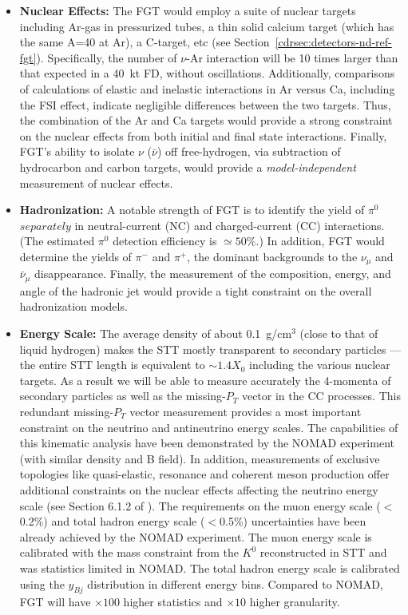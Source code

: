 \begin{itemize}
    \item {\bf Nuclear Effects:} The FGT would employ a suite of
      nuclear targets including Ar-gas in pressurized tubes, a thin
      solid calcium target (which has the same A=40 at Ar), a
      C-target, etc (see Section~\ref{cdrsec:detectors-nd-ref-fgt}).
      Specifically, the number of $\nu$-Ar interaction will be 10
      times larger than that expected in a 40~kt FD, without
      oscillations. Additionally, comparisons of calculations of
      elastic and inelastic interactions in Ar versus Ca, including
      the FSI effect, indicate negligible differences between the two
      targets. Thus, the combination of the Ar and Ca targets would
      provide a strong constraint on the nuclear effects from both
      initial and final state interactions.  Finally, FGT's ability to
      isolate $\nu$ ($\bar\nu$) off free-hydrogen, via subtraction of
      hydrocarbon and carbon targets, would provide a 
      {\em model-independent} measurement of nuclear effects.

    \item {\bf  Hadronization:} A notable strength of FGT is to identify the yield of $\pi^0$ $separately$ in neutral-current 
    (NC) and charged-current (CC) interactions. (The estimated $\pi^0$ detection efficiency is $\simeq 50\%$.) In addition, 
    FGT would determine the yields of $\pi^-$ and $\pi^+$, the dominant backgrounds to the $\nu_\mu$ and 
    $\bar\nu_\mu$ disappearance. Finally, the measurement of the composition, energy, and angle of the hadronic jet 
    would provide a tight constraint on the overall hadronization models. 

    \item {\bf Energy Scale:} The average density of about 0.1~g/cm$^3$ (close to that of liquid hydrogen) 
    makes the STT mostly transparent to secondary particles --- the entire STT length is equivalent to 
    $\sim 1.4 X_0$ including the various nuclear targets. As a result we will be able to measure accurately 
    the 4-momenta of secondary particles as well as the missing-$P_T$ vector in the CC processes. 
    This redundant missing-$P_T$ vector measurement provides a most important constraint 
    on the neutrino and antineutrino energy scales. The capabilities of this kinematic analysis have been 
    demonstrated by the NOMAD experiment (with similar density and B field). 
    In addition, measurements of exclusive topologies like quasi-elastic, resonance and coherent meson production  
    offer additional constraints on the nuclear effects affecting the neutrino energy scale 
    (see Section 6.1.2 of \volphys).  %
    The requirements on the muon energy scale ($<$0.2\%) and total hadron 
    energy scale ($<$0.5\%) uncertainties have been already achieved by the NOMAD experiment. The muon energy 
    scale is calibrated with the mass constraint from the $K^0$ reconstructed in STT and was statistics limited 
    in NOMAD. The total hadron energy scale is calibrated using the $y_{Bj}$ distribution in different 
    energy bins. Compared to NOMAD, FGT will have $\times 100$ higher statistics and $\times 10$ higher 
    granularity.  
\end{itemize}

